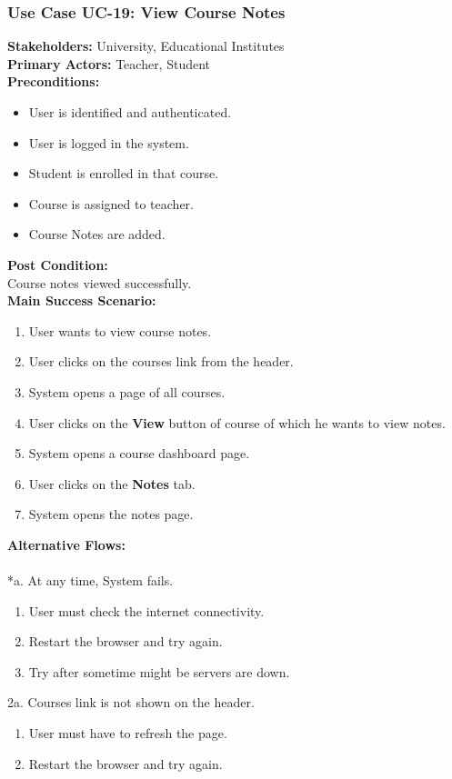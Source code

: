 \documentclass[12pt]{article}
\begin{document}
\subsubsection{Use Case UC-19: View Course Notes}
\textbf{Stakeholders: } University, Educational Institutes \\
\textbf{Primary Actors: }Teacher, Student \\
\textbf{Preconditions:}
\begin{itemize}
\item User is identified and authenticated.
\item User is logged in the system.
\item Student is enrolled in that course.
\item Course is assigned to teacher.
\item Course Notes are added.
\end{itemize}
\textbf{Post Condition: }\\
Course notes viewed successfully.\\
\textbf{Main Success Scenario:}
\begin{enumerate}
\item User wants to view course notes.
\item User clicks on the courses link from the header.
\item System opens a page of all courses.
\item User clicks on the \textbf{View} button of course of which he wants to view notes.
\item System opens a course dashboard page.
\item User clicks on the \textbf{Notes} tab.
\item System opens the notes page.
\end{enumerate}
\textbf{Alternative Flows:}\\
\\
*a. At any time, System fails.
\begin{enumerate}
\item User must check the internet connectivity.
\item Restart the browser and try again.
\item Try after sometime might be servers are down.
\end{enumerate}
2a. Courses link is not shown on the header.
\begin{enumerate}
\item User must have to refresh the page.
\item Restart the browser and try again.
\end{enumerate} 
\end{document}
